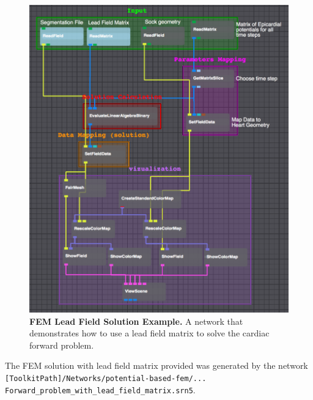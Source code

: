 \begin{figure}[H]
\begin{center}
\includegraphics[width=\textwidth]{ECGToolkitGuide_figures/FEM_LeadNet.png}
\caption{{\bf FEM Lead Field Solution Example.} A network that demonstrates how to use a lead field matrix to solve the cardiac forward problem.}
\label{fig:FEM_LeadNet}
\end{center}
\end{figure}
\noindent
The FEM solution with lead field matrix provided was generated by the network \newline
{\tt [ToolkitPath]/Networks/potential-based-fem/... \\Forward\_problem\_with\_lead\_field\_matrix.srn5}.

